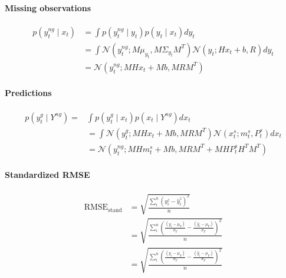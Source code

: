 \documentclass{article}
\newcommand{\norm}[3]{\mathcal{N}\left(#1; #2, #3\right)} %
\begin{document}
\setcounter{equation}{0} 

\paragraph{Missing observations} 



\begin{equation}\label{eq:deriv_partial_obs_state}
\begin{split}
    p(y_t^{ng} \mid x_t) &= \int p(y_t^{ng} \mid y_t) p(y_t \mid x_t) dy_t\\
    &= \int \norm{y^{ng}_t}{M\mu_{y_t}}{M\Sigma_{y_t}M^T} \norm{y_t}{Hx_t + b}{R} dy_t\\
    &= \norm{y^{ng}_t}{MHx_t + Mb}{MRM^T}
\end{split}
\end{equation}

\paragraph{Predictions}

\begin{equation}\label{eq:deriv_predictions}
\begin{split}
    p(y_t^g \mid Y^{ng}) = &\int p(y^g_t \mid x_t) p(x_t \mid Y^{ng}) dx_t\\
    & = \int \norm{y_t^g}{MHx_t + Mb}{MRM^T} \norm{x^s_t}{m^s_t}{P^s_t} dx_t\\
    & = \norm{y^{ng}_t}{MHm^s_t + Mb}{MRM^T + MHP^s_tH^TM^T}
\end{split}
\end{equation}

\paragraph{Standardized RMSE}

\begin{equation}
\begin{aligned}
    \text{RMSE}_{\text{stand}} &= \sqrt{\frac{\sum_i^n (y^z_i - \hat{y}^z_i)^2}{n}}\\
    &= \sqrt{\frac{\sum_i^n (\frac{(y_i - \mu_Y)}{\sigma_Y} - \frac{(\hat{y}_i - \mu_Y)}{\sigma_Y})^2}{n}}\\
    &= \sqrt{\frac{\sum_i^n (\frac{(y_i - \mu_Y)}{\sigma_Y} - \frac{(\hat{y}_i - \mu_Y)}{\sigma_Y})^2}{n}}
\end{aligned}
\end{equation}
\end{document}
